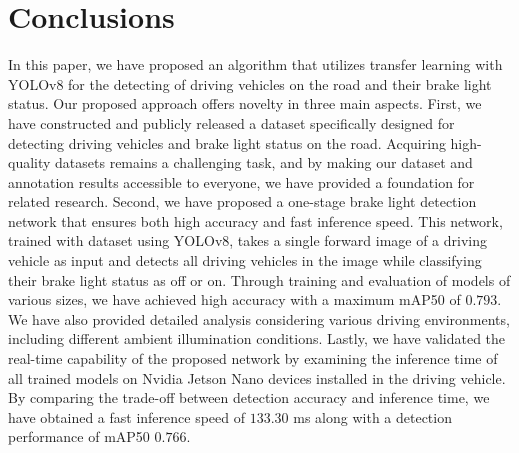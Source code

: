 \section{Conclusions}
\label{sec:conclusions}


In this paper, we have proposed an algorithm that utilizes transfer learning with YOLOv8 for the detecting of driving vehicles on the road and their brake light status.
Our proposed approach offers novelty in three main aspects.
First, we have constructed and publicly released a dataset specifically designed for detecting driving vehicles and brake light status on the road.
Acquiring high-quality datasets remains a challenging task, and by making our dataset and annotation results accessible to everyone, we have provided a foundation for related research.
Second, we have proposed a one-stage brake light detection network that ensures both high accuracy and fast inference speed.
This network, trained with dataset using YOLOv8, takes a single forward image of a driving vehicle as input and detects all driving vehicles in the image while classifying their brake light status as off or on.
Through training and evaluation of models of various sizes, we have achieved high accuracy with a maximum mAP50 of $0.793$.
We have also provided detailed analysis considering various driving environments, including different ambient illumination conditions.
Lastly, we have validated the real-time capability of the proposed network by examining the inference time of all trained models on Nvidia Jetson Nano devices installed in the driving vehicle.
By comparing the trade-off between detection accuracy and inference time, we have obtained a fast inference speed of $133.30$ ms along with a detection performance of mAP50 $0.766$.

